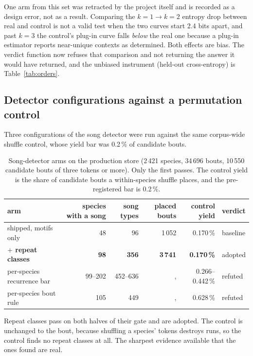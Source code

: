 \documentclass[10pt,twocolumn,a4paper]{article}
\begin{document}
One arm from this set was retracted by the project itself and is recorded as a design error, not as a result. Comparing the $k=1 \to k=2$ entropy drop between real and control
is not a valid test when the two curves start 2.4 bits apart, and past $k=3$ the control's
plug-in curve falls \emph{below} the real one because a plug-in estimator reports
near-unique contexts as determined. Both effects are bias. The verdict function now refuses
that comparison and not returning the answer it would have returned, and the unbiased
instrument (held-out cross-entropy) is
Table~\ref{tab:orders}.

\subsection{Detector configurations against a permutation control}

Three configurations of the song detector were run against the same corpus-wide shuffle
control, whose yield bar was 0.2\,\% of candidate bouts.

\begin{table}[t]
\centering
\small
\caption{Song-detector arms on the production store (2\,421 species, 34\,696 bouts, 10\,550
candidate bouts of three tokens or more). Only the first passes. The control yield is the
share of candidate bouts a within-species shuffle places, and the pre-registered bar is
0.2\,\%.}
\label{tab:songdetector}
\begin{tabular}{L{5.6cm} r r r r l}
\toprule
arm & species with a song & song types & placed bouts & control yield & verdict \\
\midrule
shipped, motifs only & 48 & 96 & 1\,052 & 0.170\,\% & baseline \\
\textbf{$+$ repeat classes} & \textbf{98} & \textbf{356} & \textbf{3\,741} & \textbf{0.170\,\%} & adopted \\
per-species recurrence bar & 99--202 & 452--636 &, & 0.266--0.442\,\% & refuted \\
per-species bout rule & 105 & 449 &, & 0.628\,\% & refuted \\
\bottomrule
\end{tabular}
\end{table}

Repeat classes pass on both halves of their gate and are adopted. The control is unchanged
to the bout, because shuffling a species' tokens destroys runs, so the control finds no
repeat classes at all. The sharpest evidence available that the ones found are real.
\end{document}
